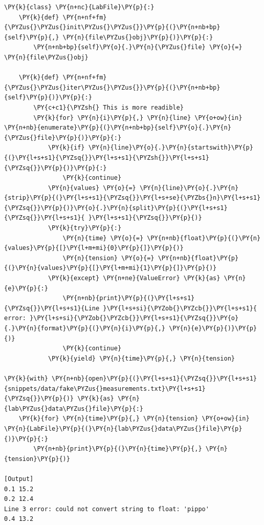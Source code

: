 \begin{Verbatim}[label=\makebox{\url{https://github.com/lucabaldini/cmepda/tree/master/slides/latex/snippets/file\_iterator\_3.py}},commandchars=\\\{\}]
\PY{k}{class} \PY{n+nc}{LabFile}\PY{p}{:}
    \PY{k}{def} \PY{n+nf+fm}{\PYZus{}\PYZus{}init\PYZus{}\PYZus{}}\PY{p}{(}\PY{n+nb+bp}{self}\PY{p}{,} \PY{n}{file\PYZus{}obj}\PY{p}{)}\PY{p}{:}
        \PY{n+nb+bp}{self}\PY{o}{.}\PY{n}{\PYZus{}file} \PY{o}{=} \PY{n}{file\PYZus{}obj}
       
    \PY{k}{def} \PY{n+nf+fm}{\PYZus{}\PYZus{}iter\PYZus{}\PYZus{}}\PY{p}{(}\PY{n+nb+bp}{self}\PY{p}{)}\PY{p}{:}
        \PY{c+c1}{\PYZsh{} This is more readible}
        \PY{k}{for} \PY{n}{i}\PY{p}{,} \PY{n}{line} \PY{o+ow}{in} \PY{n+nb}{enumerate}\PY{p}{(}\PY{n+nb+bp}{self}\PY{o}{.}\PY{n}{\PYZus{}file}\PY{p}{)}\PY{p}{:}
            \PY{k}{if} \PY{n}{line}\PY{o}{.}\PY{n}{startswith}\PY{p}{(}\PY{l+s+s1}{\PYZsq{}}\PY{l+s+s1}{\PYZsh{}}\PY{l+s+s1}{\PYZsq{}}\PY{p}{)}\PY{p}{:}
                \PY{k}{continue}
            \PY{n}{values} \PY{o}{=} \PY{n}{line}\PY{o}{.}\PY{n}{strip}\PY{p}{(}\PY{l+s+s1}{\PYZsq{}}\PY{l+s+se}{\PYZbs{}n}\PY{l+s+s1}{\PYZsq{}}\PY{p}{)}\PY{o}{.}\PY{n}{split}\PY{p}{(}\PY{l+s+s1}{\PYZsq{}}\PY{l+s+s1}{ }\PY{l+s+s1}{\PYZsq{}}\PY{p}{)}
            \PY{k}{try}\PY{p}{:}
                \PY{n}{time} \PY{o}{=} \PY{n+nb}{float}\PY{p}{(}\PY{n}{values}\PY{p}{[}\PY{l+m+mi}{0}\PY{p}{]}\PY{p}{)}
                \PY{n}{tension} \PY{o}{=} \PY{n+nb}{float}\PY{p}{(}\PY{n}{values}\PY{p}{[}\PY{l+m+mi}{1}\PY{p}{]}\PY{p}{)}
            \PY{k}{except} \PY{n+ne}{ValueError} \PY{k}{as} \PY{n}{e}\PY{p}{:}
                \PY{n+nb}{print}\PY{p}{(}\PY{l+s+s1}{\PYZsq{}}\PY{l+s+s1}{Line }\PY{l+s+si}{\PYZob{}\PYZcb{}}\PY{l+s+s1}{ error: }\PY{l+s+si}{\PYZob{}\PYZcb{}}\PY{l+s+s1}{\PYZsq{}}\PY{o}{.}\PY{n}{format}\PY{p}{(}\PY{n}{i}\PY{p}{,} \PY{n}{e}\PY{p}{)}\PY{p}{)}
                \PY{k}{continue}
            \PY{k}{yield} \PY{n}{time}\PY{p}{,} \PY{n}{tension}

\PY{k}{with} \PY{n+nb}{open}\PY{p}{(}\PY{l+s+s1}{\PYZsq{}}\PY{l+s+s1}{snippets/data/fake\PYZus{}measurements.txt}\PY{l+s+s1}{\PYZsq{}}\PY{p}{)} \PY{k}{as} \PY{n}{lab\PYZus{}data\PYZus{}file}\PY{p}{:}
    \PY{k}{for} \PY{n}{time}\PY{p}{,} \PY{n}{tension} \PY{o+ow}{in} \PY{n}{LabFile}\PY{p}{(}\PY{n}{lab\PYZus{}data\PYZus{}file}\PY{p}{)}\PY{p}{:}
        \PY{n+nb}{print}\PY{p}{(}\PY{n}{time}\PY{p}{,} \PY{n}{tension}\PY{p}{)}

[Output]
0.1 15.2
0.2 12.4
Line 3 error: could not convert string to float: 'pippo'
0.4 13.2
\end{Verbatim}